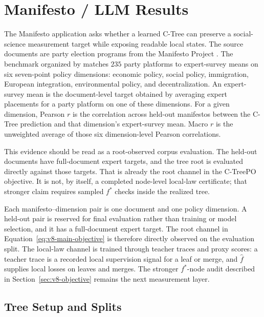 \section{Manifesto / LLM Results}\label{sec:v8-manifesto-results}

The Manifesto application asks whether a learned C-Tree can preserve a
social-science measurement target while exposing readable local states. The
source documents are party election programs from the Manifesto Project
\citep{ManifestoProject2025a,ManifestoCorpus2025}. The benchmark organized by
\citet{BenoitEtAl2025} matches $235$ party platforms to expert-survey means on
six seven-point policy dimensions: economic policy, social policy,
immigration, European integration, environmental policy, and decentralization.
An expert-survey mean is the document-level target obtained by averaging expert
placements for a party platform on one of these dimensions. For a given
dimension, Pearson \(r\) is the correlation across held-out manifestos between
the C-Tree prediction and that dimension's expert-survey mean. Macro \(r\) is
the unweighted average of those six dimension-level Pearson correlations.

This evidence should be read as a root-observed corpus evaluation. The held-out
documents have full-document expert targets, and the tree root is evaluated
directly against those targets. That is already the root channel in the
C-TreePO objective. It is not, by itself, a completed node-level local-law
certificate; that stronger claim requires sampled \(f^\ast\) checks inside the
realized tree.

Each manifesto--dimension pair is one document and one policy dimension. A
held-out pair is reserved for final evaluation rather than training or model
selection, and it has a full-document expert target. The root channel in
Equation~\eqref{eq:v8-main-objective} is therefore directly observed on the
evaluation split. The local-law channel is trained through teacher traces and
proxy scores: a teacher trace is a recorded local supervision signal for a
leaf or merge, and \(\widehat f\) supplies local losses on leaves and merges.
The stronger \(f^\ast\)-node audit described in Section~\ref{sec:v8-objective}
remains the next measurement layer.

\subsection{Tree Setup and Splits}\label{sec:v8-benoit-tree-setup}

